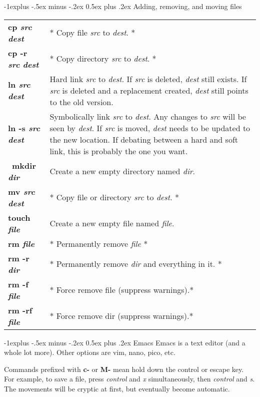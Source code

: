 \documentclass[10pt,landscape]{article}
\makeatletter
\renewcommand{\subsection}{\@startsection{subsection}{2}{0mm}%
                                {-1explus -.5ex minus -.2ex}%
                                {0.5ex plus .2ex}%
                                {\normalfont\normalsize\bfseries}}
\makeatother
\begin{document}
\begin{multicols}{3}
\subsection{Adding, removing, and moving files}
\begin{tabular}{@{}p{\the\MyLen}%
                @{}p{\linewidth-\the\MyLen}@{}}
\textbf{cp \textit{src} \textit{dest}} & * Copy file \textit{src} to \textit{dest}. *\\
\textbf{cp -r \textit{src} \textit{dest}} & * Copy directory \textit{src} to \textit{dest}. *\\
\textbf{ln \textit{src} \textit{dest}} & Hard link \textit{src} to \textit{dest}. If \textit{src} is deleted, \textit{dest} still exists. If \textit{src} is deleted and a replacement created, \textit{dest} still points to the old version.\\
\textbf{ln -s \textit{src} \textit{dest}} & Symbolically link \textit{src} to \textit{dest}. Any changes to \textit{src} will be seen by \textit{dest}. If \textit{src} is moved, \textit{dest} needs to be updated to the new location. If debating between a hard and soft link, this is probably the one you want.\\\
\textbf{mkdir \textit{dir}} & Create a new empty directory named \textit{dir}.\\
\textbf{mv \textit{src} \textit{dest}} & * Copy file or directory \textit{src} to \textit{dest}. *\\
\textbf{touch \textit{file}} & Create a new empty file named \textit{file}.\\
\textbf{rm \textit{file}} & * Permanently remove \textit{file} *\\
\textbf{rm -r \textit{dir}} & * Permanently remove \textit{dir} and everything in it. *\\
\textbf{rm -f \textit{file}} & * Force remove file (suppress warnings).*\\
\textbf{rm -rf \textit{file}} & * Force remove dir (suppress warnings).*\\
\end{tabular}
\subsection{Emacs}
Emacs is a text editor (and a whole lot more). Other options are vim, nano, pico, etc. 

Commands prefixed with \textbf{c-} or \textbf{M-} mean hold down the control or escape key. For example, to save a file, press \textit{control} and \textit{x} simultaneously, then \textit{control} and \textit{s}. The movements will be cryptic at first, but eventually become automatic.


\end{multicols}
\end{document}
